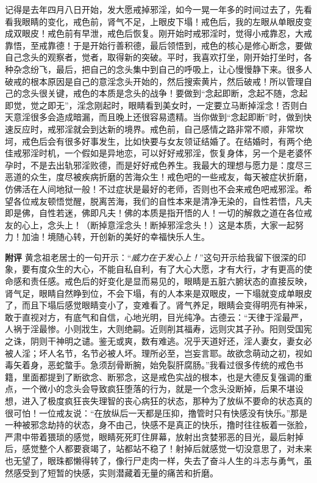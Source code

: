 \begin{case}
    记得是去年四月八日开始，发大愿戒掉邪淫，如今一晃一年多的时间过去了，先看看我眼睛的变化，戒色前，肾气不足，上眼皮下塌！戒色后，我的左眼从单眼皮变成双眼皮！戒色前有早泄，戒色后恢复。刚开始时戒邪淫时，觉得小戒靠忍，大戒靠悟，至戒靠德！于是开始行善积德，最后领悟到，戒色的核心是修心断念，要做自己念头的观察者，觉者，取得新的突破。平时，我喜欢打坐，刚开始打坐时，各种杂念纷飞，最后，把自己的念头集中到自己的呼吸上，让心慢慢静下来。很多人破戒的根本原因是自己的意淫念头开始的，然后搜索黄片，然后破戒！所以管理自己的念头很关键，戒色的本质是念头的战争！要做到“念起即断，念起不随，念起即觉，觉之即无”，淫念刚起时，眼睛看到美女时，一定要立马断掉淫念！否则白天意淫很多会造成暗漏，而且晚上还很容易遗精。当你做到“念起即断”时，做到快速反应时，戒邪淫就会到达新的境界。戒色前，自己感情之路非常不顺，非常坎坷，戒色后会有很多好事发生，比如快要与女友领证结婚了。在结婚时，有两个绝佳戒邪淫时机，一个假如是异地恋，可以好好戒邪淫，恢复身体，另一个是老婆怀孕时，不是去出轨邪淫败德，而是好好戒色养生。我最大的理想与愿力是：度尽三恶道的众生，度尽被疾病折磨的苦海众生！戒色吧的一些戒友，每天被症状折磨，仿佛活在人间地狱一般！不过症状是最好的老师，否则也不会来戒色吧戒邪淫。希望各位戒友顿悟觉醒，脱离苦海，我们的自性本来是清净无染的，自性若悟，凡夫即是佛，自性若迷，佛即凡夫！佛的本质是指开悟的人！一切的解救之道在各位戒友的心上，念头上！（断掉意淫念头！断掉邪淫念头！）这是本质，大家一起努力！加油！境随心转，开创新的美好的幸福快乐人生。

    \textbf{附评} 黄念祖老居士的一句开示：“\textit{威力在于发心上！}”这句开示给我留下很深的印象，要有度众生的大心，不能自私自利，有了大心大愿，才有大行，才有更高的使命感和责任感。戒色后的好变化是显而易见的，眼睛是五脏六腑状态的直接反映，肾气足，眼睛自然睁到位，不会下塌，有的人本来是双眼皮，一下塌就变成单眼皮了，而且下塌后感觉眼睛变小了，变难看了。肾气养足，眼睛会变得明亮有神采，敢于直视对方，有底气和自信，心地光明，目光纯净。古德云：“天律于淫最严，人祸于淫最惨。小则戕生，大则绝嗣。近则削其福寿，远则灾其子孙。阳则受国宪之诛，阴则干神明之谴。鉴无或爽，数有难逃。况乎天道好还，淫人妻女，妻女必被人淫；坏人名节，名节必被人坏。理所必至，岂妄言耶。故欲念萌动之初，视如毒矢着身，恶蛇螫手。急须刮骨断腕，始免裂肝腐肠。”我看过很多传统的戒色书籍，里面都提到了断欲念、断邪念，这是戒色实战的根本，也是大德反复强调的重点，一个微小的念头会导致疯狂堕落的行为，就是一个念头没断掉，后果不堪设想，进入了极度疯狂丧失理智的丧心病狂的状态，那种为了放纵不要命的状态真的很可怕！一位戒友说：“在放纵后一天都是压抑，撸管时只有快感没有快乐。”那是一种被邪念劫持的状态，身不由己，快感不是真正的快乐，撸时往往板着一张脸，严肃中带着猥琐的感觉，眼睛死死盯住屏幕，放射出贪婪邪恶的目光，最后射掉后，感觉整个人都要衰竭了，站都站不稳了！射掉后就感觉一切没意思了，对未来也无望了，眼珠都懒得转了，像行尸走肉一样，失去了奋斗人生的斗志与勇气，虽然感受到了短暂的快感，实则潜藏着无量的痛苦和折磨。


\end{case}
